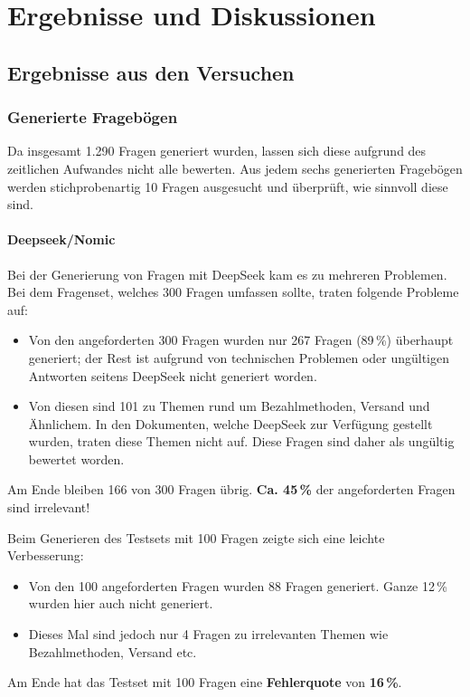 \chapter{Ergebnisse und Diskussionen}

\section{Ergebnisse aus den Versuchen}

\subsection{Generierte Fragebögen}
Da insgesamt 1.290 Fragen generiert wurden, lassen sich diese aufgrund des zeitlichen Aufwandes nicht alle bewerten. Aus jedem sechs generierten Fragebögen werden stichprobenartig 10 Fragen ausgesucht und überprüft, wie sinnvoll diese sind.

\subsubsection{Deepseek/Nomic}

Bei der Generierung von Fragen mit DeepSeek kam es zu mehreren Problemen.
Bei dem Fragenset, welches 300 Fragen umfassen sollte, traten folgende Probleme auf:
\begin{itemize}
    \item Von den angeforderten 300 Fragen wurden nur 267 Fragen (89\,\%) überhaupt generiert; der Rest ist aufgrund von technischen Problemen oder ungültigen Antworten seitens DeepSeek nicht generiert worden.
    \item Von diesen sind 101 zu Themen rund um Bezahlmethoden, Versand und Ähnlichem. In den Dokumenten, welche DeepSeek zur Verfügung gestellt wurden, traten diese Themen nicht auf. Diese Fragen sind daher als ungültig bewertet worden.
\end{itemize}

Am Ende bleiben 166 von 300 Fragen übrig. \textbf{Ca. 45\,\%} der angeforderten Fragen sind irrelevant!

Beim Generieren des Testsets mit 100 Fragen zeigte sich eine leichte Verbesserung:
\begin{itemize}
    \item Von den 100 angeforderten Fragen wurden 88 Fragen generiert. Ganze 12\,\% wurden hier auch nicht generiert.
    \item Dieses Mal sind jedoch nur 4 Fragen zu irrelevanten Themen wie Bezahlmethoden, Versand etc.
\end{itemize}
Am Ende hat das Testset mit 100 Fragen eine \textbf{Fehlerquote} von \textbf{16\,\%}.

